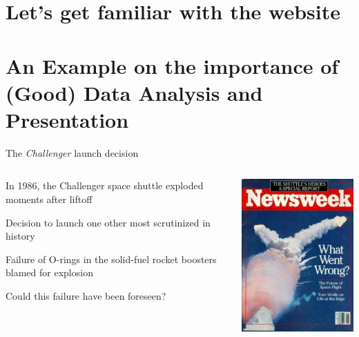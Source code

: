 \documentclass[11pt]{beamer}
\begin{document}

\section{Let's get familiar with the website}

\section{An Example on the importance of (Good) Data Analysis and Presentation}


\begin{frame}{The \textit{Challenger} launch decision}
\begin{columns}
\begin{column}{0.5\textwidth}
In 1986, the Challenger space shuttle exploded moments after liftoff

Decision to launch one other most scrutinized in history

Failure of O-rings in the solid-fuel rocket boosters blamed for explosion

Could this failure have been foreseen? 
\end{column}
\begin{column}{0.5\textwidth}
\begin{center}
\includegraphics[scale=.5]{shuttle.jpg}
\end{center}
\end{column}
\end{columns}
\end{frame}
\end{document}
